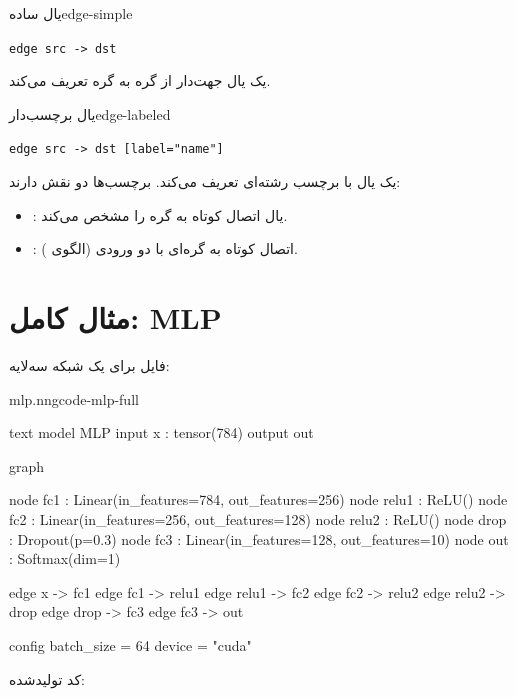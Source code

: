 \documentclass{nngraph-fa}
\begin{document}
\begin{dfnbox}{یال ساده}{edge-simple}
\begin{latin}
\texttt{edge src -> dst}
\end{latin}

یک یال جهت‌دار از گره  به گره  تعریف می‌کند.
\end{dfnbox}

\begin{dfnbox}{یال برچسب‌دار}{edge-labeled}
\begin{latin}
\texttt{edge src -> dst [label="name"]}
\end{latin}

یک یال با برچسب رشته‌ای تعریف می‌کند. برچسب‌ها دو نقش دارند:
\begin{itemize}
    \item {}: یال اتصال کوتاه به گره  را مشخص
    می‌کند.
    \item {}: اتصال کوتاه به گره‌ای با دو ورودی
    (الگوی ).
\end{itemize}
\end{dfnbox}

\section{مثال کامل: MLP}

فایل  برای یک شبکه سه‌لایه:

\begin{codebox}{mlp.nng}{code-mlp-full}
\begin{amzcode}{text}
model MLP {
    input  x   : tensor(784)
    output out
}

graph {
    node fc1   : Linear(in_features=784, out_features=256)
    node relu1 : ReLU()
    node fc2   : Linear(in_features=256, out_features=128)
    node relu2 : ReLU()
    node drop  : Dropout(p=0.3)
    node fc3   : Linear(in_features=128, out_features=10)
    node out   : Softmax(dim=1)

    edge x     -> fc1
    edge fc1   -> relu1
    edge relu1 -> fc2
    edge fc2   -> relu2
    edge relu2 -> drop
    edge drop  -> fc3
    edge fc3   -> out
}

config {
    batch_size = 64
    device = "cuda"
}
\end{amzcode}
\end{codebox}

کد  تولیدشده:
\end{document}
